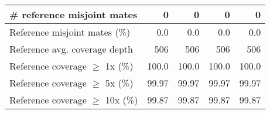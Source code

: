 \documentclass[12pt,a4paper]{article}
\begin{document}
\begin{table}[ht]
\begin{center}
\begin{tabular}{|l*{4}{|r}|}
\# reference misjoint mates & 0 & 0 & 0 & 0 \\ \hline
Reference misjoint mates (\%) & 0.0 & 0.0 & 0.0 & 0.0 \\ \hline
Reference avg. coverage depth & 506 & 506 & 506 & 506 \\ \hline
Reference coverage $\geq$ 1x (\%) & 100.0 & 100.0 & 100.0 & 100.0 \\ \hline
Reference coverage $\geq$ 5x (\%) & 99.97 & 99.97 & 99.97 & 99.97 \\ \hline
Reference coverage $\geq$ 10x (\%) & 99.87 & 99.87 & 99.87 & 99.87 \\ \hline
\end{tabular}
\end{center}
\end{table}
\end{document}
